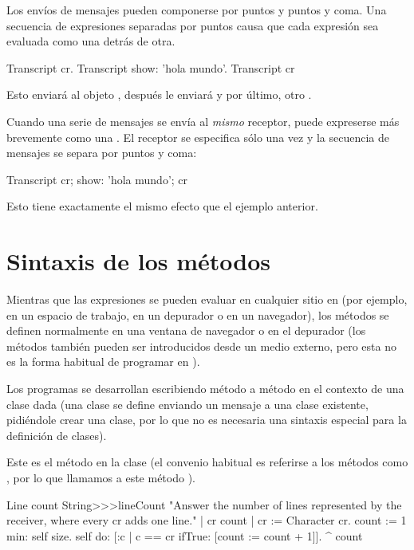 \documentclass[a4paper,10pt,twoside]{book}
\begin{document}
Los env\'ios de mensajes pueden componerse por puntos y puntos y coma. Una secuencia de expresiones separadas por puntos causa que cada expresi\'on sea evaluada como una  detr\'as de otra.

\begin{code}{}
Transcript cr.
Transcript show: 'hola mundo'.
Transcript cr
\end{code}

\noindent
Esto enviar\'a  al objeto , despu\'es le enviar\'a  y por \'ultimo, otro .

Cuando una serie de mensajes se env\'ia al \emph{mismo} receptor, puede expreserse m\'as brevemente como una .
El receptor se especifica s\'olo una vez y la secuencia de mensajes se separa por puntos y coma:

\begin{code}{}
Transcript cr;
    show: 'hola mundo';
    cr
\end{code}
Esto tiene exactamente el mismo efecto que el ejemplo anterior.

\section{Sintaxis de los m\'etodos}

Mientras que las expresiones se pueden evaluar en cualquier sitio en \pharo (por ejemplo, en un espacio de trabajo, en un depurador o en un navegador), los m\'etodos se definen normalmente en una ventana de navegador o en el depurador
(los m\'etodos tambi\'en pueden ser introducidos desde un medio externo, pero esta no es la forma habitual de programar en \pharo).

Los programas se desarrollan escribiendo m\'etodo a m\'etodo en el contexto de una clase dada (una clase se define enviando un mensaje a una clase existente, pidi\'endole crear una clase, por lo que no es necesaria una sintaxis especial para la definici\'on de clases).

Este es el m\'etodo  en la clase  (el convenio habitual es referirse a los m\'etodos como , por lo que llamamos a este m\'etodo ).

\begin{method}[lineCount]{Line count}
String>>>lineCount
   "Answer the number of lines represented by the receiver,
   where every cr adds one line."
   | cr count |
   cr := Character cr.
   count := 1 min: self size.
   self do:
      [:c | c == cr ifTrue: [count := count + 1]].
   ^ count
\end{method}
\end{document}
